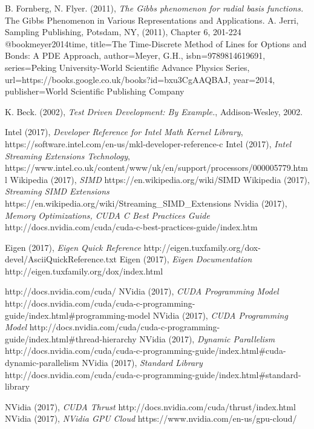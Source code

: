 \documentclass[a4paper]{amsart}
\begin{document}
\begin{thebibliography}{99}
 B. Fornberg, N. Flyer. (2011), {\em The Gibbs phenomenon for radial basis functions.} The Gibbs Phenomenon in Various Representations and Applications.  A. Jerri, Sampling Publishing, Potsdam, NY, (2011), Chapter 6, 201-224
@book{meyer2014time,
  title={The Time-Discrete Method of Lines for Options and Bonds: A PDE Approach},
  author={Meyer, G.H.},
  isbn={9789814619691},
  series={Peking University-World Scientific Advance Physics Series},
  url={https://books.google.co.uk/books?id=bxu3CgAAQBAJ},
  year={2014},
  publisher={World Scientific Publishing Company}
}

 K. Beck. (2002), {\em Test Driven Development: By Example.}, Addison-Wesley, 2002.

 Intel (2017), {\em Developer Reference for Intel Math Kernel Library}, https://software.intel.com/en-us/mkl-developer-reference-c
 Intel (2017), {\em Intel Streaming Extensions Technology}, 
https://www.intel.co.uk/content/www/uk/en/support/processors/000005779.html
 Wikipedia (2017), {\em SIMD} https://en.wikipedia.org/wiki/SIMD
 Wikipedia (2017), {\em Streaming SIMD Extensions} https://en.wikipedia.org/wiki/Streaming\_SIMD\_Extensions
 Nvidia (2017), {\em Memory Optimizations, CUDA C Best Practices Guide} http://docs.nvidia.com/cuda/cuda-c-best-practices-guide/index.htm

 Eigen (2017), {\em Eigen Quick Reference} http://eigen.tuxfamily.org/dox-devel/AsciiQuickReference.txt
 Eigen (2017), {\em Eigen Documentation} http://eigen.tuxfamily.org/dox/index.html


http://docs.nvidia.com/cuda/
 NVidia (2017), {\em CUDA Programming Model} http://docs.nvidia.com/cuda/cuda-c-programming-guide/index.html\#programming-model
 NVidia (2017), {\em CUDA Programming Model} http://docs.nvidia.com/cuda/cuda-c-programming-guide/index.html\#thread-hierarchy
 NVidia (2017), {\em Dynamic Parallelism} http://docs.nvidia.com/cuda/cuda-c-programming-guide/index.html\#cuda-dynamic-parallelism
 NVidia (2017), {\em Standard Library} http://docs.nvidia.com/cuda/cuda-c-programming-guide/index.html\#standard-library

 NVidia (2017), {\em CUDA Thrust} http://docs.nvidia.com/cuda/thrust/index.html
 NVidia (2017), {\em NVidia GPU Cloud} https://www.nvidia.com/en-us/gpu-cloud/


\end{thebibliography}
\end{document}
